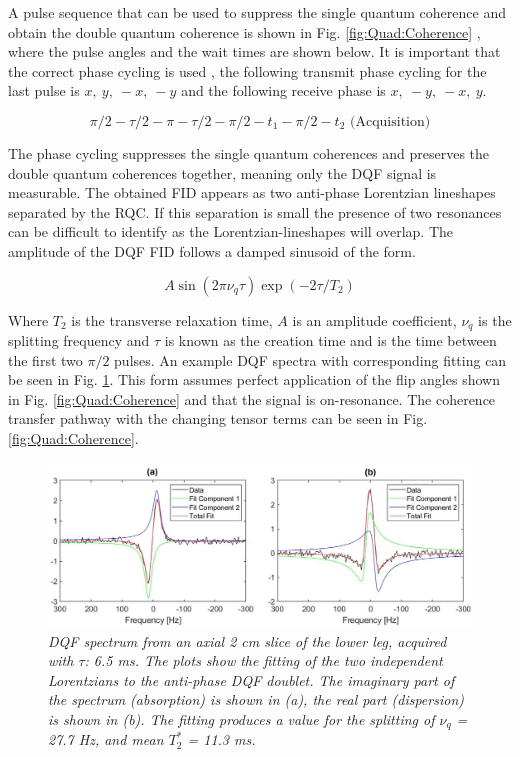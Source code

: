 A pulse sequence that can be used to suppress the single quantum coherence and obtain the double quantum coherence is shown in Fig. \ref{fig:Quad:Coherence} \cite{Sharf1995DetectionNMR-Spectroscopy}, where the pulse angles and the wait times are shown below. It is important that the correct phase cycling is used \cite{Bodenhausen1984SelectionExperiments}, the following transmit phase cycling for the last pulse is $x,\:y,\:-x,\:-y$ and the following receive phase is $x,\:-y,\:-x,\:y$. 

\begin{equation}
    \pi/2-\tau/2-\pi-\tau/2-\pi/2-t_1-\pi/2-t_2 \textrm{ (Acquisition)}
    \label{eqn:Quad:Pulse}
\end{equation}

The phase cycling suppresses the single quantum coherences and preserves the double quantum coherences together, meaning only the \ac{DQF} signal is measurable. The obtained FID appears as two anti-phase Lorentzian lineshapes separated by the \ac{RQC}. If this separation is small the presence of two resonances can be difficult to identify as the Lorentzian-lineshapes will overlap. The amplitude of the \ac{DQF} FID follows a damped sinusoid of the form. 

\begin{equation}
    A\sin(2\pi\nu_q\tau)\exp(-2\tau/T_2)
    \label{eqn:Quad:Amplitude}
\end{equation}

Where $T_2$ is the transverse relaxation time, $A$ is an amplitude coefficient, $\nu_q$ is the splitting frequency and $\tau$ is known as the creation time and is the time between the first two $\pi/2$ pulses. An example \ac{DQF} spectra with corresponding fitting can be seen in Fig. \ref{fig:Quad:Ex_DQF}. This form assumes perfect application of the flip angles shown in Fig. \ref{fig:Quad:Coherence} and that the signal is on-resonance. The coherence transfer pathway with the changing tensor terms can be seen in Fig. \ref{fig:Quad:Coherence}.

\begin{figure}
    \centering
    \includegraphics[width=1\textwidth]{Figures/Quad/Example_DQF.png}
    \caption{\textit{\ac{DQF} spectrum from an axial 2 cm slice of the lower leg, acquired with $\tau$: 6.5 ms. The plots show the fitting of the two independent Lorentzians to the anti-phase \ac{DQF} doublet. The imaginary part of the spectrum (absorption) is shown in (a), the real part (dispersion) is shown in (b). The fitting produces a value for the splitting of $\nu_q$ = 27.7 Hz, and mean $T_2^*$ = 11.3 ms.}}
    \label{fig:Quad:Ex_DQF}
\end{figure}

